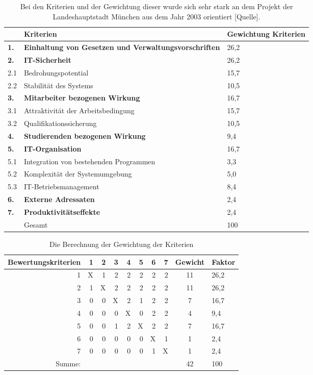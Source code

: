 \documentclass[12pt,utf8]{scrartcl}
\begin{document}
\begin{table}[h]
\begin{tabular}{|p{}|p{12cm}|p{2cm}|}
\hline
 & Kriterien & Gewichtung Kriterien\\
\hline
\textbf{1.} &  \textbf{Einhaltung von Gesetzen und Verwaltungsvorschriften}  & 26,2\\
\hline
\hline
\textbf{2.} & \textbf{IT-Sicherheit} & 26,2\\
\hline
2.1 & Bedrohungspotential & 15,7 \\
\hline
2.2 & Stabilität des Systems & 10,5 \\
\hline
\hline
\textbf{3.} & \textbf{Mitarbeiter bezogenen Wirkung} & 16,7\\
\hline
3.1 & Attraktivität der Arbeitsbedingung & 15,7 \\
\hline
3.2 & Qualifikationssicherung & 10,5 \\
\hline
\hline
\textbf{4.} & \textbf{Studierenden bezogenen Wirkung} & 9,4\\
\hline
\hline
\textbf{5.} & \textbf{IT-Organisation} & 16,7\\
\hline
5.1 & Integration von bestehenden Programmen & 3,3 \\
\hline
5.2 & Komplexität der Systemumgebung & 5,0 \\
\hline
5.3 & IT-Betriebsmanagement & 8,4 \\
\hline
\hline
\textbf{6.} & \textbf{Externe Adressaten} & 2,4\\
\hline
\hline
\textbf{7.} & \textbf{Produktivitätseffekte} & 2,4\\
\hline
\hline
\hline
 & Gesamt & 100\\
\hline
\end{tabular}
\caption*{Bei den Kriterien und der Gewichtung dieser wurde sich sehr stark an dem Projekt der Landeshauptstadt München aus dem Jahr 2003 orientiert [Quelle].}
\end{table}

\begin{table}[h!]
\centering
\begin{tabular}{|r|r|r|r|r|r|r|r|c|l|}
\hline
Bewertungskriterien & 1 & 2 & 3 & 4 & 5 & 6 & 7 & Gewicht & Faktor \\
\hline
1 & X & 1 & 2 & 2 & 2 & 2 & 2 & 11 & 26,2 \\
\hline
2 & 1 & X & 2 & 2 & 2 & 2 & 2 & 11 & 26,2 \\
\hline
3 & 0 & 0 & X & 2 & 1 & 2 & 2 & 7 & 16,7 \\
\hline
4 & 0 & 0 & 0 & X & 0 & 2 & 2 & 4 & 9,4 \\
\hline
5 & 0 & 0 & 1 & 2 & X & 2 & 2 & 7 & 16,7 \\
\hline
6 & 0 & 0 & 0 & 0 & 0 & X & 1 & 1 & 2,4 \\
\hline
7 & 0 & 0 & 0 & 0 & 0 & 1 & X & 1 & 2,4 \\
\hline
Summe: & & & & & & & & 42 & 100 \\
\hline
\end{tabular}
\caption*{Die Berechnung der Gewichtung der Kriterien}
\end{table}
\end{document}
